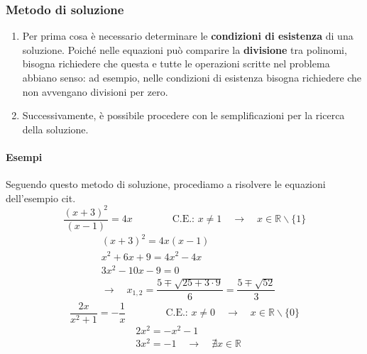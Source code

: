 \subsubsection{Metodo di soluzione}
\begin{enumerate}
    \item Per prima cosa è necessario determinare le \textbf{condizioni di esistenza} di una soluzione. Poiché nelle equazioni può comparire la \textbf{divisione} tra polinomi, bisogna richiedere che questa e tutte le operazioni scritte nel problema abbiano senso: ad esempio, nelle condizioni di esistenza bisogna richiedere che non avvengano divisioni per zero.
    \item Successivamente, è possibile procedere con le semplificazioni per la ricerca della soluzione.
\end{enumerate}

\paragraph{Esempi}
Seguendo questo metodo di soluzione, procediamo a risolvere le equazioni dell'esempio {\color{red} cit}.
\begin{equation}
    \dfrac{(x + 3)^2}{(x-1)} = 4 x  \qquad \qquad \text{C.E.: } x \ne 1 \quad \rightarrow \quad x \in \mathbb{R}\backslash \{1\}
\end{equation}
\begin{equation}
    \begin{aligned}
        & (x + 3)^2 = 4x(x-1) \\
        & x^2+6x+9 = 4x^2 -4x \\
        & 3x^2-10x-9 = 0 \\
        & \rightarrow \quad x_{1,2} = \dfrac{5 \mp \sqrt{25+3\cdot9}}{6} = \dfrac{5 \mp \sqrt{52}}{3}
    \end{aligned}
\end{equation}
\begin{equation}
    \dfrac{2x}{x^2+1} = -\dfrac{1}{x} \qquad \qquad \text{C.E.: } x \ne 0 \quad \rightarrow \quad x \in \mathbb{R}\backslash \{0\}
\end{equation}
\begin{equation}
\begin{aligned}
    & 2x^2= - x^2 - 1 \\
    & 3x^2= - 1 \quad \rightarrow \quad \nexists x \in \mathbb{R}
\end{aligned}
\end{equation}

